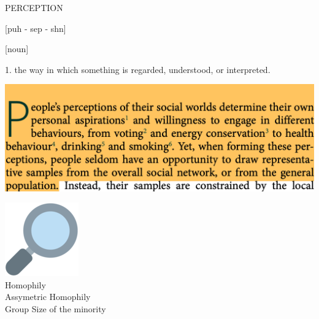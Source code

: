 \documentclass{beamer}
\begin{document}
\begin{frame}
    \begin{center}
    \begin{minipage}{.5\textwidth}
        \LARGE{PERCEPTION}
    \end{minipage}
    \begin{minipage}{.3\textwidth}
        \normalsize{[puh - sep - shn]}
    \end{minipage}
    \vspace{.5cm}

    \hspace{-8cm} \normalsize{[noun]}\\
    \end{center}
    \hspace{.8cm} \normalsize{1. the way in which something is regarded, understood, or interpreted.}
\end{frame}

\begin{frame}
    \begin{center}
        \includegraphics[width=.75\textwidth]{static/perception.png}
    \end{center}
\end{frame}

\begin{frame}
    \begin{center}
        \includegraphics[width=.07\textwidth]{static/search.png} \\ \vspace{.5cm}
        \large{Homophily} \\ \vspace{.5cm}
        \large{Assymetric Homophily} \\ \vspace{.5cm}
        \large{Group Size of the minority}
    \end{center}
\end{frame}
\end{document}
